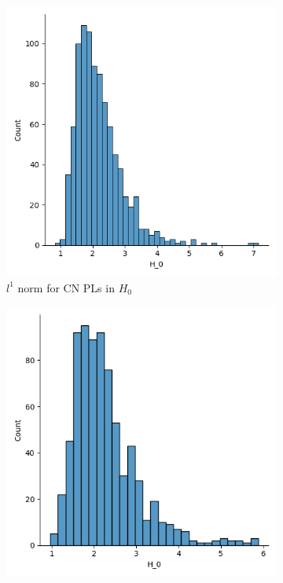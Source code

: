 \documentclass{article}
\begin{document}
\begin{figure}
  \centering
  \begin{subfigure}{0.3\textwidth}
    \includegraphics[width=\textwidth]{figures/average_pls/average_pl_CN_H_0.png}
    \caption{$l^1$ norm for CN PLs in $H_0$}
  \end{subfigure}
  \begin{subfigure}{0.3\textwidth}
    \includegraphics[width=\textwidth]{figures/average_pls/average_pl_MCI_H_0.png}

\end{subfigure}
\end{figure}
\end{document}
